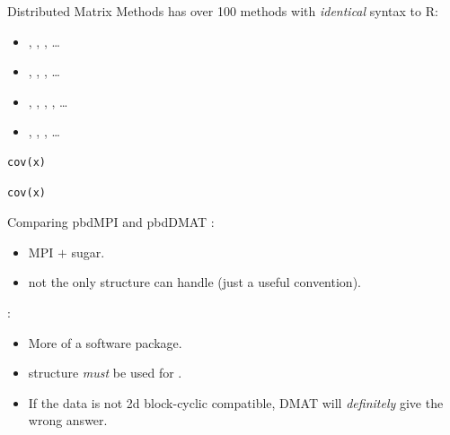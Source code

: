 \begin{frame}[fragile]
  \begin{block}{Distributed Matrix Methods}\pause
     has over 100 methods with \emph{identical} syntax to R:
    \begin{itemize}
     \item \code{\`{}[\`{}}, , , \dots
     \item {}, , , \dots
     \item \code{\`{}\%*\%\`{}}, , , , \dots
     \item {}, , , \dots
    \end{itemize}
\begin{lstlisting}[title=Serial Code]
cov(x)
\end{lstlisting}
  
\begin{lstlisting}[title=Parallel Code]
cov(x)
\end{lstlisting}
  \end{block}
\end{frame}

\begin{frame}[fragile]
  \begin{block}{Comparing pbdMPI and pbdDMAT}\pause
{}:
  \begin{itemize}
     \item MPI $+$ sugar.
     \item {} not the only structure  can handle (just a useful convention).
     \end{itemize}
     
     :
     \begin{itemize}
     \item More of a software package.
     \item {} structure \emph{must} be used for .
     \item If the data is not 2d block-cyclic compatible, DMAT will \emph{definitely} give the wrong answer.
    \end{itemize}
  \end{block}
\end{frame}

